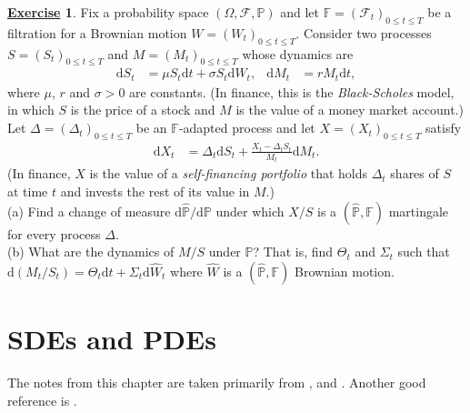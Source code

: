 \documentclass[12pt]{book}
\numberwithin{equation}{chapter}
\theoremstyle{plain}
\numberwithin{theorem}{section}
\theoremstyle{definition}
\newtheorem{exercise}{\underline{Exercise}}
\numberwithin{exercise}{chapter}
\newcommand{\<}{\langle}
\renewcommand{\>}{\rangle}
\renewcommand{\(}{\left(}
\renewcommand{\)}{\right)}
\renewcommand{\[}{\left[}
\renewcommand{\]}{\right]}
\newcommand\Fb{\mathds{F}}
\newcommand\Pb{\mathds{P}}
\newcommand\Fc{\mathscr{F}}
\newcommand\Om{\Omega}
\newcommand\sig{\sigma}
\newcommand\Sig{\Sigma}
\newcommand\Del{\Delta}
\newcommand\Pbh{\widehat{\Pb}}
\newcommand\Wh{\widehat{W}}
\newcommand\dd{\mathrm{d}}
\begin{document}
\begin{exercise}
\label{exer:8.13}
Fix a probability space $(\Om, \Fc, \Pb)$ and let $\Fb = (\Fc_t)_{0 \leq t \leq T}$ be a filtration for a Brownian motion $W = (W_t)_{0 \leq t \leq T}$.
Consider two processes $S = (S_t)_{0 \leq t \leq T}$ and $M = (M_t)_{0 \leq t \leq T}$ whose dynamics are
\begin{align}
\dd S_t
	&=	\mu S_t \dd t + \sig S_t \dd W_t , &
\dd M_t
	&=	r M_t \dd t ,
\end{align}
where $\mu$, $r$ and $\sig > 0$ are constants.
(In finance, this is the \textit{Black-Scholes} model, in which $S$ is the price of a stock and $M$ is the value of a money market account.)
Let $\Del = (\Del_t)_{0 \leq t \leq T}$ be an $\Fb$-adapted process and let $X = (X_t)_{0 \leq t \leq T}$ satisfy
\begin{align}
\dd X_t
	&=	\Del_t \dd S_t + \frac{X_t - \Del_t S_t}{M_t} \dd M_t .
\end{align}
(In finance, $X$ is the value of a \textit{self-financing portfolio} that holds $\Del_t$ shares of $S$ at time $t$ and invests the rest of its value in $M$.)\\
(a) Find a change of measure $\dd \Pbh/ \dd \Pb$ under which $X/S$ is a $(\Pbh,\Fb)$ martingale for every process $\Del$.\\
(b) What are the dynamics of $M/S$ under $\Pbh$?  That is, find $\Theta_t$ and $\Sig_t$ such that $\dd (M_t/S_t) = \Theta_t \dd t + \Sig_t \dd \Wh_t$ where $\Wh$ is a $(\Pbh,\Fb)$ Brownian motion.
\end{exercise}

%
%

\chapter{SDEs and PDEs}
\label{chapter:SDEPDE}

The notes from this chapter are taken primarily from \cite[Chapter 6]{shreve2004}, \cite[Chapters 5, 7, 8 and 9]{oksendal} and \cite{linetskybook}.
Another good reference is \cite[Chapter 15]{karlin}.

\end{document}
